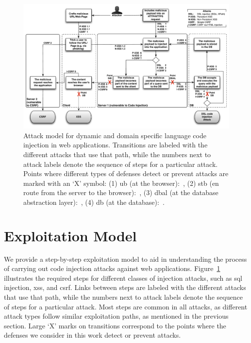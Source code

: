 \documentclass[10pt,journal,compsoc]{IEEEtran}
\begin{document}
\begin{figure}[t]
\begin{center}
\leavevmode
\includegraphics[scale=0.50]{attacks-steps-CSRF.pdf}
\end{center}
\caption{\label{fig:attacks}Attack model for dynamic and domain specific
language code injection in web applications.
Transitions are labeled with the different attacks that use that path,
while the numbers next to attack labels denote the 
sequence of steps for a particular attack.
Points where different types of defenses
detect or prevent attacks are marked with an `X' symbol:
(1) {\sc ub} (at the browser):~\cite{KJKV09,LV09,TNH07,NSS06,APKLM10,ML10,YCIS07,PSC09,VDDPJ11,OWVS08,DDHPJ10,VFJKKV07,SLMS14,BV08,SSM10},
(2) {\sc s}t{\sc b} (en route from the server to the browser):~\cite{RDWDE07,JKK06a,GC09,JB07,NLC07,WPLKK09,JEP08,PS11},
(3) {\sc dbal} (at the database abstraction layer):~\cite{BWS05,SW06,HCF05,XBS06,PB05,PMP11,MS09,HO05,SMS13},
(4) {\sc db} (at the database):~\cite{BK04,LLW02,VMV05}.}
\end{figure}

\section{Exploitation Model}
\label{sec:model}

We provide a step-by-step exploitation model to aid in understanding the process
of carrying out code injection attacks against web
applications. Figure~\ref{fig:attacks} illustrates the required steps for
different classes of injection attacks,
such as {\sc sql} injection, {\sc xss}, and {\sc csrf}. Links between steps are
labeled with the different attacks that use that path, while the
numbers next to attack labels denote the sequence of steps for a
particular attack. Most steps are common in all attacks, as different attack
types follow similar exploitation paths, as mentioned in
the previous section. Large `X' marks on transitions correspond to the
points where the defenses we consider in this work detect or prevent attacks.
\end{document}
